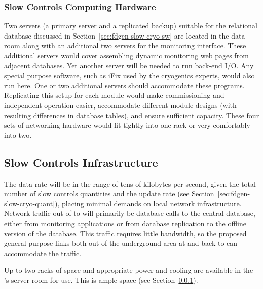 \subsubsection{Slow Controls Computing Hardware}
\label{sec:fdgen-slow-cryo-slow-compute}
Two servers (a primary server and a replicated backup) suitable for the relational database discussed
in Section~\ref{sec:fdgen-slow-cryo-sw} are located in the  data
room along with an additional
two servers for the  monitoring interface. These additional servers would cover assembling dynamic  monitoring web pages from adjacent
databases.  Yet another server will be needed to run back-end I/O.  Any special purpose software, such as iFix used by the cryogenics experts, would
also run here. One or two additional servers should accommodate these programs.
Replicating this setup for each module would make commissioning and independent operation easier, accommodate different module
designs (with resulting differences in database tables), and ensure
sufficient capacity.  These four sets of networking hardware would fit tightly into one rack or very comfortably into two.  



\subsection{Slow Controls Infrastructure}
\label{sec:fdgen-slow-cryo-slow-infra}

The data rate will be in the range of tens of kilobytes per second, given the total number of slow controls quantities and the update rate  
(see Section~\ref{sec:fdgen-slow-cryo-quant}), placing minimal demands
on local network infrastructure.
Network traffic out of   to  will primarily be database calls
to the central  database, either from monitoring applications or from
database replication to the offline version of the  database.  This
traffic requires little bandwidth, so the proposed general purpose
links both out of the %
underground area at   and back to   can accommodate the traffic.

Up to two racks of space and appropriate power and cooling are
available in the 's  server room for  use. This is ample space (see Section~\ref{sec:fdgen-slow-cryo-slow-compute}).


